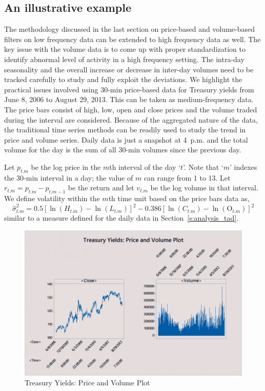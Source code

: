 \subsection{An illustrative example \label{sec:illus_ex}}

The methodology discussed in the last section on price-based and volume-based filters on low frequency data can be extended to high frequency data as well. The key issue with the volume data is to come up with proper standardization to identify abnormal level of activity in a high frequency setting. The intra-day seasonality and the overall increase or decrease in inter-day volumes need to be tracked carefully to study and fully exploit the deviations. We highlight the practical issues involved using 30-min price-based data for Treasury yields from June 8, 2006 to August 29, 2013. This can be taken as medium-frequency data. The price bars consist of high, low, open and close prices and the volume traded during the interval are considered. Because of the aggregated nature of the data, the traditional time series methods can be readily used to study the trend in price and volume series. Daily data is just a snapshot at 4~p.m. and the total volume for the day is the sum of all 30-min volumes since the previous day.


Let $p_{t.m}$ be the log price in the $m$th interval of the day `$t$'. Note that `$m$' indexes the 30-min interval in a day; the value of $m$ can range from 1 to 13. Let $r_{t.m}= p_{t.m} - p_{t.m-1}$ be the return and let $v_{t.m}$ be the log volume in that interval. We define volatility within the $m$th time unit based on the price bars data as,
	\begin{equation} \label{eqn:hatsigmasq}
	\hat{\sigma}_{t. m}^2= 0.5 [ \ln(H_{t. m}) - \ln(L_{t.m})]^2 - 0.386[\ln(C_{t.m}) - \ln(\text{O}_{t . m})]^2
	\end{equation}
similar to a measure defined for the daily data in Section~\ref{s:analysis_tad}.

        \begin{figure}[!ht]
        \centering
        \includegraphics[width=\textwidth]{chapters/chapter_stat_ts/figures/treasury.png}
        \caption{Treasury Yields: Price and Volume Plot \label{fig:treasuryyields}}
        \end{figure}
        
